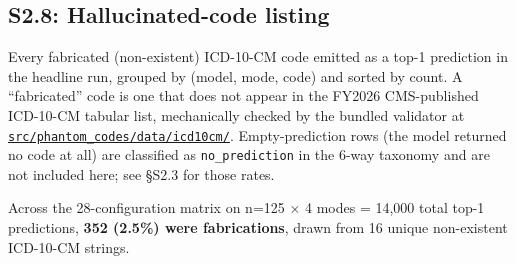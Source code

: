\subsection{S2.8: Hallucinated-code listing}\label{s2.8-hallucinated-code-listing}

Every fabricated (non-existent) ICD-10-CM code emitted as a top-1
prediction in the headline run, grouped by (model, mode, code) and
sorted by count. A ``fabricated'' code is one that does not appear in
the FY2026 CMS-published ICD-10-CM tabular list, mechanically
checked by the bundled validator at
\href{https://github.com/briankfung/phantom-codes/tree/main/src/phantom_codes/data/icd10cm/}{\texttt{src/phantom\_codes/data/icd10cm/}}.
Empty-prediction rows (the model returned no code at all) are
classified as \texttt{no\_prediction} in the 6-way taxonomy and are not
included here; see §S2.3 for those rates.

Across the 28-configuration matrix on n=125 × 4 modes = 14,000
total top-1 predictions, \textbf{352 (2.5\%) were fabrications}, drawn
from 16 unique non-existent ICD-10-CM strings.


